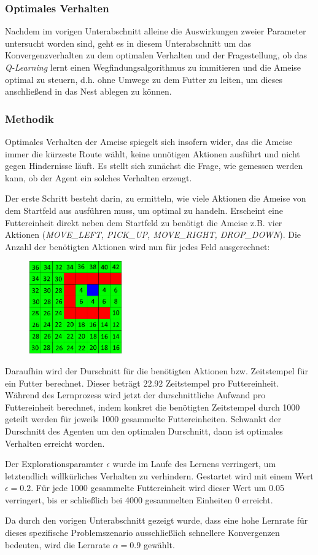 \subsubsection{Optimales Verhalten}
Nachdem im vorigen Unterabschnitt alleine die Auswirkungen zweier Parameter untersucht worden sind, geht es in diesem Unterabschnitt um das Konvergenzverhalten zu dem optimalen Verhalten und der Fragestellung, ob das \textit{Q-Learning} lernt einen Wegfindungsalgorithmus zu immitieren und die Ameise optimal zu steuern, d.h. ohne Umwege zu dem Futter zu leiten, um dieses anschließend in das Nest ablegen zu können.

\subsubsection*{Methodik}
Optimales Verhalten der Ameise spiegelt sich insofern wider, das die Ameise immer die kürzeste Route wählt, keine unnötigen Aktionen ausführt und nicht gegen Hindernisse läuft. Es stellt sich zunächst die Frage, wie gemessen werden kann, ob der Agent ein solches Verhalten erzeugt. 
\par 
Der erste Schritt besteht darin, zu ermitteln, wie viele Aktionen die Ameise von dem Startfeld aus ausführen muss, um optimal zu handeln. Erscheint eine Futtereinheit direkt neben dem Startfeld zu benötigt die Ameise z.B. vier Aktionen (\textit{MOVE\_LEFT, PICK\_UP, MOVE\_RIGHT, DROP\_DOWN}). Die Anzahl der benötigten Aktionen wird nun für jedes Feld ausgerechnet:
\begin{figure}[H]
    \centering
    \includegraphics[width=150px]{images/NeededTimestampsFromEverywhere}
    \label{fig:test1}
\end{figure}
Daraufhin wird der Durschnitt für die benötigten Aktionen bzw. Zeitstempel für ein Futter berechnet. Dieser beträgt $22.92$ Zeitstempel pro Futtereinheit. Während des Lernprozess wird jetzt der durschnittliche Aufwand pro Futtereinheit berechnet, indem konkret die benötigten Zeitstempel durch 1000 geteilt werden für jeweils 1000 gesammelte Futtereinheiten. Schwankt der Durschnitt des Agenten um den optimalen Durschnitt, dann ist optimales Verhalten erreicht worden.
\par 
Der Explorationsparamter $\epsilon$ wurde im Laufe des Lernens verringert, um letztendlich willkürliches Verhalten zu verhindern. Gestartet wird mit einem Wert $\epsilon = 0.2$. Für jede 1000 gesammelte Futtereinheit wird dieser Wert um 0.05 verringert, bis er schließlich bei 4000 gesammelten Einheiten 0 erreicht. 
\par 
Da durch den vorigen Unterabschnitt gezeigt wurde, dass eine hohe Lernrate für dieses spezifische Problemszenario ausschließlich schnellere Konvergenzen bedeuten, wird die Lernrate $\alpha = 0.9$ gewählt.

